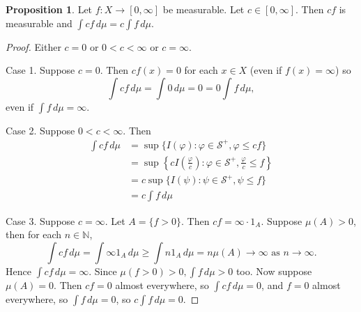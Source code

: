 \documentclass{article}
\newcommand{\N}{\mathbb{N}}
\theoremstyle{definition}
\newtheorem{proposition}[theorem]{Proposition}
\begin{document}
\begin{proposition}
Let $f: X \longrightarrow [0, \infty]$ be measurable. Let $c \in [0, \infty]$. Then $cf$ is measurable and $\int cf\,d\mu = c\int f\,d\mu$.
\end{proposition}
\begin{proof}
    Either $c = 0$ or $0 < c < \infty$ or $c = \infty$.
    
    Case 1. Suppose $c = 0$. Then $cf(x) = 0$ for each $x \in X$ (even if $f(x) = \infty$) so \[\int cf\,d\mu = \int 0\,d\mu = 0 = 0\int f\,d\mu,\] even if $\int f\,d\mu = \infty$.
    
    Case 2. Suppose $0 < c < \infty$. Then
    \begin{equation*}
    \begin{split}
        \int cf\,d\mu &= \sup\{I(\varphi) : \varphi \in \mathscr{S}^+, \varphi \leq cf\} \\
            &= \sup\left\{cI\left(\frac{\varphi}{c}\right) : \varphi \in \mathscr{S}^+, \frac{\varphi}{c} \leq f\right\} \\
            &= c\sup\{I(\psi) : \psi \in \mathscr{S}^+, \psi \leq f\} \\
            &= c\int f\,d\mu
    \end{split}
    \end{equation*}
    
    Case 3. Suppose $c = \infty$. Let $A = \{f > 0\}$. Then $cf = \infty \cdot 1_A$. Suppose $\mu(A) > 0$, then for each $n \in \N$,
    \[
        \int cf\,d\mu = \int \infty 1_A \,d\mu \geq \int n1_A\,d\mu = n\mu(A) \to \infty \text{ as } n \to \infty.
    \]
    Hence $\int cf\,d\mu = \infty$. Since $\mu(f > 0) > 0, \int f\,d\mu > 0$ too. Now suppose $\mu(A) = 0$. Then $cf = 0$ almost everywhere, so $\int cf\,d\mu = 0$, and $f = 0$ almost everywhere, so $\int f\,d\mu = 0$, so $c\int f\,d\mu = 0$.
\end{proof}
\end{document}
